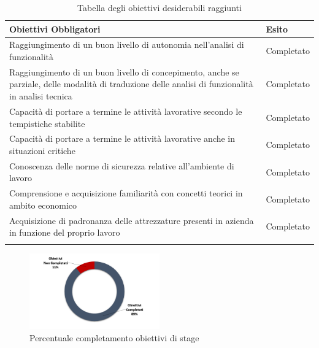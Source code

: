 	\begin{center}
		  \bgroup
		  \def\arraystretch{1.4}
		   \begin{longtable}{ | p{9cm} | p{2cm} | }  \hline
			 
			 \cellcolor[gray]{0.9} \textbf{Obiettivi Obbligatori} & \cellcolor[gray]{0.9} \textbf{Esito} \\ \hline
						 
			Raggiungimento di un buon livello di autonomia nell'analisi di funzionalità & Completato  \\ \hline
			Raggiungimento di un buon livello di concepimento, anche se parziale, delle modalità di traduzione delle analisi di funzionalità in analisi tecnica & Completato \\ \hline
			Capacità di portare a termine le attività lavorative secondo le tempistiche stabilite & Completato \\ \hline
			Capacità di portare a termine le attività lavorative anche in situazioni critiche & Completato \\ \hline
			Conoscenza delle norme di sicurezza relative all'ambiente di lavoro & Completato \\ \hline
			Comprensione e acquisizione familiarità con concetti teorici in ambito economico & Completato  \\ \hline
			Acquisizione di padronanza delle attrezzature presenti in azienda in funzione del proprio lavoro & Completato \\ \hline
			
			\caption{Tabella degli obiettivi desiderabili raggiunti}
			
		    \end{longtable}
		  \egroup
		\end{center}

	\begin{figure}[H]
		\centering
	   	\includegraphics[width=0.5\textwidth]{immagini/Percentuale_Obiettivi_Completati}
	   	\caption{Percentuale completamento obiettivi di stage}
	\end{figure}

